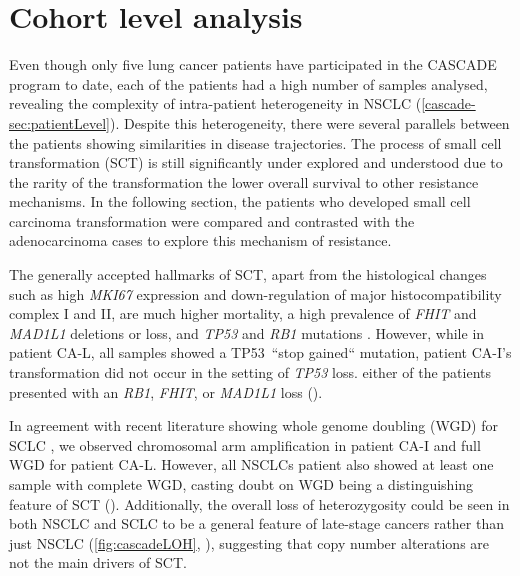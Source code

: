 

\section{Cohort level analysis}
\label{cascade-sec:cohortLevel}

Even though only five lung cancer patients have participated in the CASCADE program to date, each of the patients had a high number of samples analysed, revealing the complexity of intra-patient heterogeneity in NSCLC (\autoref{cascade-sec:patientLevel}). Despite this heterogeneity, there were several parallels between the patients showing similarities in disease trajectories. The process of small cell transformation (SCT) is still significantly under explored and understood due to the rarity of the transformation  the lower overall survival  to other resistance mechanisms. In the following section, the patients who developed small cell carcinoma transformation were compared and contrasted with the adenocarcinoma cases to explore this mechanism of resistance.

The generally accepted hallmarks of SCT, apart from the histological changes such as high \textit{MKI67} expression and down-regulation of major histocompatibility complex I and II, are much higher mortality, a high prevalence of \textit{FHIT} and \textit{MAD1L1} deletions or loss, and \textit{TP53} and \textit{RB1} mutations \cite{Meerbeeck2011,Raso2021}. However, while in patient CA-L, all samples showed a TP53~``stop gained`` mutation, patient CA-I's transformation did not occur in the setting of  \textit{TP53} loss. either of the patients presented with an \textit{RB1}, \textit{FHIT}, or \textit{MAD1L1} loss (). 

In agreement with recent literature showing whole genome doubling (WGD) for SCLC \cite{Zhou2021}, we observed chromosomal arm amplification in patient CA-I and full WGD for patient CA-L. However, all NSCLCs patient also showed at least one sample with complete WGD, casting doubt on WGD being a distinguishing feature of SCT (). Additionally, the overall loss of heterozygosity could be seen in both NSCLC and SCLC to be a general feature of late-stage cancers rather than just NSCLC (\autoref{fig:cascadeLOH}, \cite{Girish2023}), suggesting that copy number alterations are not the main drivers of SCT.

